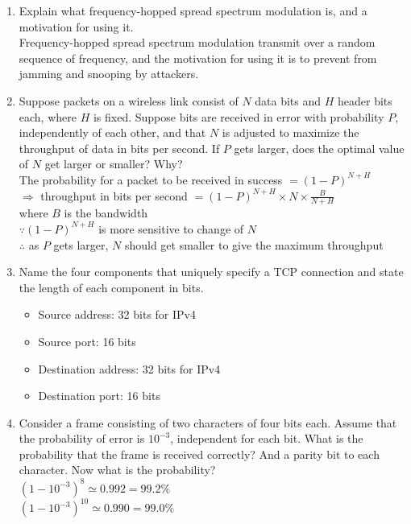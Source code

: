 \documentclass[10pt, a4paper]{article}
\begin{document}
\begin{enumerate}
\item\mbox{} Explain what frequency-hopped spread spectrum modulation is, and a motivation for using it.\\
    \color{blue}
    Frequency-hopped spread spectrum modulation transmit over a random sequence of frequency, and the motivation for using it is to prevent from jamming and snooping by attackers.
    \color{black}
\item\mbox{}Suppose packets on a wireless link consist of $N$ data bits and $H$ header bits each, where $H$ is fixed. Suppose bits are received in error with probability $P$, independently of each other, and that $N$ is adjusted to maximize the throughput of data in bits per second. If $P$ gets larger, does the optimal value of $N$ get larger or smaller? Why?\\
    \color{blue}
    The probability for a packet to be received in success $= (1 - P)^{N+H}$\\
    $\Rightarrow$ throughput in bits per second $= (1 - P)^{N+H} \times N \times \frac{B}{N + H}$\\
    where $B$ is the bandwidth\\
    $\because (1 - P)^{N+H}$ is more sensitive to change of $N$\\
    $\therefore$ as $P$ gets larger, $N$ should get smaller to give the maximum throughput
    \color{black}
\item\mbox{}Name the four components that uniquely specify a TCP connection and state the length of each component in bits.
    \color{blue}
    \begin{itemize}
    \item Source address: 32 bits for IPv4
    \item Source port: 16 bits
    \item Destination address: 32 bits for IPv4
    \item Destination port: 16 bits
    \end{itemize}
    \color{black}
\item\mbox{}Consider a frame consisting of two characters of four bits each. Assume that the probability of error is $10^{-3}$, independent for each bit. What is the probability that the frame is received correctly? And a parity bit to each character. Now what is the probability?\\
    \color{blue}
    $(1 - 10^{-3})^8 \simeq 0.992 = 99.2\%$\\
    $(1 - 10^{-3})^{10} \simeq 0.990 = 99.0\%$
    \color{black}

\end{enumerate}
\end{document}
